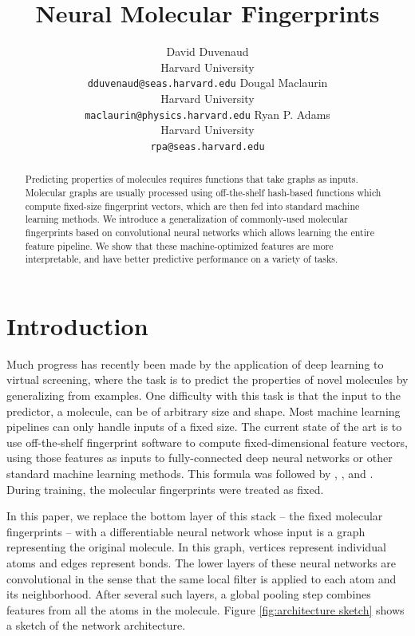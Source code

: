 \documentclass{article}
\title{Neural Molecular Fingerprints}
\author{
David Duvenaud\\
Harvard University\\
\texttt{dduvenaud@seas.harvard.edu}
\And
Dougal Maclaurin\\
Harvard University\\
\texttt{maclaurin@physics.harvard.edu}
\And
Ryan P. Adams\\
Harvard University\\
\texttt{rpa@seas.harvard.edu}
}
\begin{document}
\maketitle

\begin{abstract}
Predicting properties of molecules requires functions that take graphs as inputs.
Molecular graphs are usually processed using off-the-shelf hash-based functions which compute fixed-size fingerprint vectors, which are then fed into standard machine learning methods.
We introduce a generalization of commonly-used molecular fingerprints based on convolutional neural networks which allows learning the entire feature pipeline.
We show that these machine-optimized features are more interpretable, and have better predictive performance on a variety of tasks.
\end{abstract}

\section{Introduction}
Much progress has recently been made by the application of deep learning to virtual screening, where the task is to predict the properties of novel molecules by generalizing from examples.
One difficulty with this task is that the input to the predictor, a molecule, can be of arbitrary size and shape.
Most machine learning pipelines can only handle inputs of a fixed size.
The current state of the art is to use off-the-shelf fingerprint software to compute fixed-dimensional feature vectors, using those features as inputs to fully-connected deep neural networks or other standard machine learning methods.
This formula was followed by \citet{unterthinerdeep}, \citet{dahl2014multi}, and \citet{ramsundar2015massively}.
During training, the molecular fingerprints were treated as fixed.

In this paper, we replace the bottom layer of this stack -- the fixed molecular fingerprints -- with a differentiable neural network whose input is a graph representing the original molecule.
In this graph, vertices represent individual atoms and edges represent bonds.
The lower layers of these neural networks are convolutional in the sense that the same local filter is applied to each atom and its neighborhood.
After several such layers, a global pooling step combines features from all the atoms in the molecule.
Figure \ref{fig:architecture sketch} shows a sketch of the network architecture.
\end{document}
